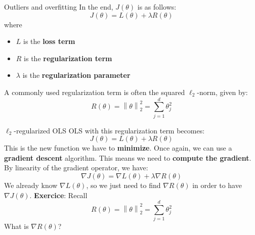 \documentclass{beamer}
\newcommand{\1}[1]{\mathbbm{1}\left[#1\right]}
\newcommand{\norm}[1]{\left\lVert#1\right\rVert}
\begin{document}
\begin{frame}{Outliers and overfitting}
In the end, $J(\theta)$ is as follows:
\begin{equation*}
J(\theta) = L(\theta) + \lambda R(\theta)
\end{equation*}
where 
\begin{itemize}
	\item $L$ is the \textbf{loss term}
	\item $R$ is the \textbf{regularization term}
	\item $\lambda$ is the \textbf{regularization parameter}
\end{itemize}
\pause
\vfill
A commonly used regularization term is often the squared $\ell_2$-norm, given by:
\begin{equation*}
R(\theta) = \norm{\theta}_2^2 = \sum_{j = 1}^d \theta_j^2
\end{equation*}
\end{frame}

\begin{frame}{$\ell_2$-regularized OLS}
OLS with this regularization term becomes:
\begin{equation*}
J(\theta) = L(\theta) + \lambda R(\theta)
\end{equation*}
\vfill
\pause
This is the new function we have to \textbf{minimize}. Once again, we can use a \textbf{gradient descent} algorithm. This means we need to \textbf{compute the gradient}. By linearity of the gradient operator, we have:
\begin{equation*}
\nabla J(\theta) = \nabla L(\theta) + \lambda \nabla R(\theta)
\end{equation*}
\pause
We already know $\nabla L(\theta)$, so we just need to find $\nabla R(\theta)$ in order to have $\nabla J(\theta)$. 
\vfill
\pause
\textbf{Exercice}: Recall
\begin{equation*}
R(\theta) = \norm{\theta}_2^2 = \sum_{j = 1}^d \theta_j^2
\end{equation*}
What is $\nabla R(\theta)$?
\end{frame}
\end{document}
